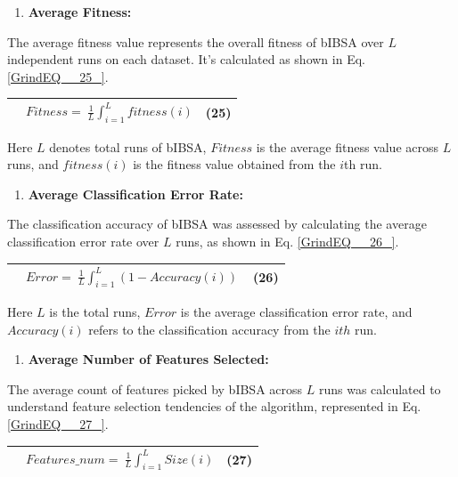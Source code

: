 \documentclass{article} %
\begin{document}
\begin{enumerate}
\item  \textbf{Average Fitness:}
\end{enumerate}

The average fitness value represents the overall fitness of bIBSA over $L$ independent runs on each dataset. It's calculated as shown in Eq. \eqref{GrindEQ__25_}.

\begin{tabular}{|p{0.4in}|p{2.9in}|p{0.5in}|} \hline 
 & $Fitness\mathrm{=\ }\frac{1}{L}\int^L_{i=1}{fitness\left(i\right)}$ & (25) \\ \hline 
\end{tabular}

Here $L$ denotes total runs of bIBSA, $Fitness$ is the average fitness value across $L$ runs, and $fitness\left(i\right)$ is the fitness value obtained from the $i$th run.

\begin{enumerate}
\item  \textbf{Average Classification Error Rate:}
\end{enumerate}

The classification accuracy of bIBSA was assessed by calculating the average classification error rate over $L$ runs, as shown in Eq. \eqref{GrindEQ__26_}.

\begin{tabular}{|p{0.4in}|p{2.9in}|p{0.5in}|} \hline 
 & $Error=\ \frac{1}{L}\int^L_{i=1}{\left(1-Accuracy\left(i\right)\right)\ }$ & (26) \\ \hline 
\end{tabular}

Here $L$ is the total runs, $Error$ is the average classification error rate, and $Accuracy\left(i\right)$ refers to the classification accuracy from the $ith$ run.

\begin{enumerate}
\item  \textbf{Average Number of Features Selected:}
\end{enumerate}

The average count of features picked by bIBSA across $L$ runs was calculated to understand feature selection tendencies of the algorithm, represented in Eq. \eqref{GrindEQ__27_}.

\begin{tabular}{|p{0.4in}|p{2.9in}|p{0.5in}|} \hline 
 & $Features\_num\mathrm{=\ }\frac{1}{L}\int^L_{i=1}{Size\left(i\right)}$ & (27) \\ \hline 
\end{tabular}
\end{document}
